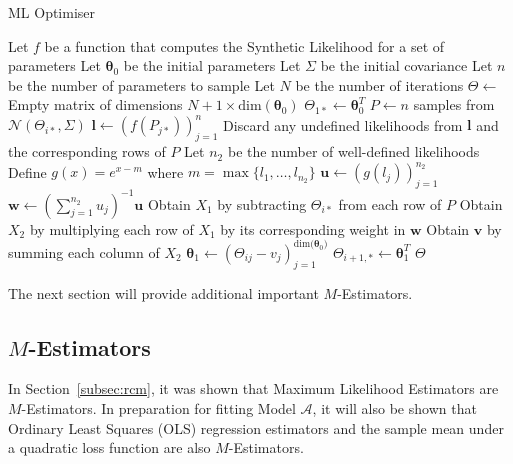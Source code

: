 \begin{singlespace}
\begin{algorithm}[H]
    \caption{ML Optimiser}
    \label{alg:ml}
    \begin{algorithmic}
        \State Let $f$ be a function that computes the Synthetic Likelihood for a set of parameters
        \State Let $\pmb{\theta}_0$ be the initial parameters
        \State Let $\Sigma$ be the initial covariance
        \State Let $n$ be the number of parameters to sample
        \State Let $N$ be the number of iterations
        \newline
            \State $\Theta \gets $ Empty matrix of dimensions $N + 1 \times \text{dim}(\pmb{\theta}_0)$
            \State $\Theta_{1*} \gets \pmb{\theta}_0^T$
                \State $P \gets n$ samples from $\mathcal{N}(\Theta_{i*}, \Sigma)$
                \State $\pmb{l} \gets (f(P_{j*}))_{j=1}^n$
                \State Discard any undefined likelihoods from $\pmb{l}$ and the corresponding rows of $P$
                \State Let $n_2$ be the number of well-defined likelihoods
                \State Define $g(x) = e^{x - m}$ where $m = \max{\{l_1, \ldots, l_{n_2}\}}$
                \State $\pmb{u} \gets (g(l_j))_{j=1}^{n_2}$
                \State $\pmb{w} \gets (\sum_{j=1}^{n_2} u_j)^{-1} \pmb{u}$
                \State Obtain $X_1$ by subtracting $\Theta_{i*}$ from each row of $P$
                \State Obtain $X_2$ by multiplying each row of $X_1$ by its corresponding weight in $\pmb{w}$
                \State Obtain $\pmb{v}$ by summing each column of $X_2$
                \State $\pmb{\theta}_1 \gets (\Theta_{ij} - v_j)_{j=1}^{\text{dim}{(\pmb{\theta}_0})}$
                \State $\Theta_{i+1, *} \gets \pmb{\theta}_1^T$
            \EndFor
            \State \Return $\Theta$
        \EndProcedure
    \end{algorithmic}
\end{algorithm}
\end{singlespace}

The next section will provide additional important $M$-Estimators.

\subsection{\texorpdfstring{$M$}{M}-Estimators}

In Section~\ref{subsec:rcm}, it was shown that Maximum Likelihood Estimators are $M$-Estimators. In preparation for fitting Model $\mathcal{A}$, it will also be shown that Ordinary Least Squares (OLS) regression estimators and the sample mean under a quadratic loss function are also $M$-Estimators.

